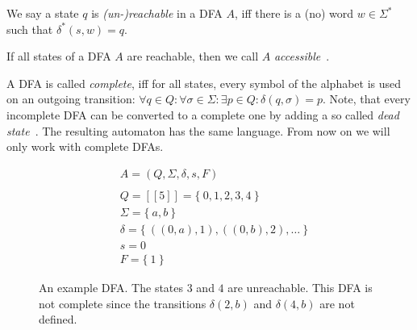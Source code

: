 \begin{definition}\label{ch:2:unreachable-states}
	We say a state $q$ is \emph{(un-)reachable} in a DFA $A$, iff there is a (no) word $w \in \Sigma^*$ such that $\delta^*(s, w) = q$.
\end{definition}
\noindent If all states of a DFA $A$ are reachable, then we call $A$ \emph{accessible}~\cite[p. 2]{CP05}.

A DFA is called \emph{complete}, iff for all states, every symbol of the alphabet is used on an outgoing transition: $\forall q\in Q\colon \forall\sigma\in\Sigma\colon \exists p\in Q\colon \delta(q,\sigma) = p$. Note, that every incomplete DFA can be converted to a complete one by adding a so called \emph{dead state}~\cite[p. 67]{HMU01}. The resulting automaton has the same language. From now on we will only work with complete DFAs.

\begin{figure}[H]
	\begin{subfigure}{.5\textwidth}\centering{}\end{subfigure}
	\hfill
	\begin{subfigure}{.4\textwidth}
		\begin{align*}
			&A = (Q, \Sigma, \delta, s ,F) \\
			&\\
			&Q = [[5]] = \{\ 0,1,2,3,4\ \} \\
			&\Sigma = \{\ a,b\ \} \\
			&\delta = \{\ ((0,a),1), ((0,b),2), \ldots\ \} \\
			&s = 0 \\
			&F = \{\ 1\ \}
		\end{align*}
	\end{subfigure}
	\caption{An example DFA. The states $3$ and $4$ are unreachable. This DFA is not complete since the transitions $\delta(2,b)$ and $\delta(4,b)$ are not defined.}
	\label{fig:dfa}
\end{figure}

